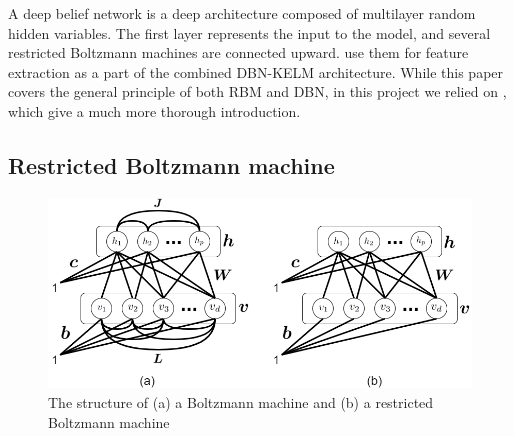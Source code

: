A deep belief network is a deep architecture composed of multilayer random
hidden variables. The first layer represents the input to the model, and several
restricted Boltzmann machines are connected upward. \citet{Han.2020} use 
them for feature extraction as a part of the combined DBN-KELM architecture.
While this paper covers the general principle of both RBM and DBN, in this
project we relied on \citet{Ghojogh.2021}, which give a much more thorough 
introduction.


\subsection{Restricted Boltzmann machine}

\begin{figure}
	\includegraphics[width=\textwidth,height=\textheight,keepaspectratio]{img/rbm.png}
	\centering
	\caption{The structure of (a) a Boltzmann machine and (b) a restricted  Boltzmann machine \cite{Ghojogh.2021}}
	\label{fig:bm-rbm}
\end{figure}

